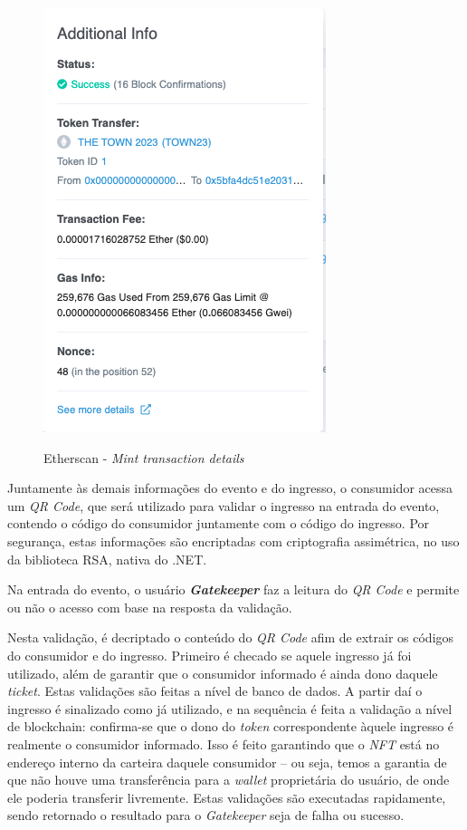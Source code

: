 {\begin{figure}[ht]
    \centering
    \caption{Etherscan - \textit{Mint transaction details}}
    \includegraphics[scale=0.3]{figuras/mint-token-details.png}
    \label{fig:mint-token-details}
\end{figure}

Juntamente às demais informações do evento e do ingresso, o consumidor acessa um \textit{QR Code}, que será utilizado para validar o ingresso na entrada do evento, contendo o código do consumidor juntamente com o código do ingresso. Por segurança, estas informações são encriptadas com criptografia assimétrica, no uso da biblioteca RSA, nativa do .NET.

Na entrada do evento, o usuário \textit{\textbf{Gatekeeper}} faz a leitura do \textit{QR Code} e permite ou não o acesso com base na resposta da validação.

Nesta validação, é decriptado o conteúdo do \textit{QR Code} afim de extrair os códigos do consumidor e do ingresso. Primeiro é checado se aquele ingresso já foi utilizado, além de garantir que o consumidor informado é ainda dono daquele \textit{ticket}. Estas validações são feitas a nível de banco de dados. A partir daí o ingresso é sinalizado como já utilizado, e na sequência é feita a validação a nível de blockchain: confirma-se que o dono do \textit{token} correspondente àquele ingresso é realmente o consumidor informado. Isso é feito garantindo que o \textit{NFT} está no endereço interno da carteira daquele consumidor -- ou seja, temos a garantia de que não houve uma transferência para a \textit{wallet} proprietária do usuário, de onde ele poderia transferir livremente. Estas validações são executadas rapidamente, sendo retornado o resultado para o \textit{Gatekeeper} seja de falha ou sucesso.
    
}
